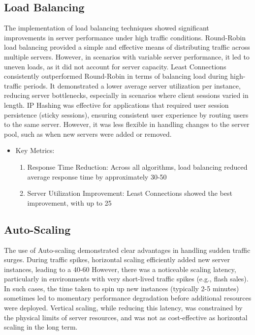 \documentclass{article}
\begin{document}
\subsection{Load Balancing}
The implementation of load balancing techniques showed significant improvements in server performance under high traffic conditions. Round-Robin load balancing provided a simple and effective means of distributing traffic across multiple servers. However, in scenarios with variable server performance, it led to uneven loads, as it did not account for server capacity.
Least Connections consistently outperformed Round-Robin in terms of balancing load during high-traffic periods. It demonstrated a lower average server utilization per instance, reducing server bottlenecks, especially in scenarios where client sessions varied in length.
IP Hashing was effective for applications that required user session persistence (sticky sessions), ensuring consistent user experience by routing users to the same server. However, it was less flexible in handling changes to the server pool, such as when new servers were added or removed.
\begin{itemize}
    \item Key Metrics:
    \begin{enumerate}
        \item Response Time Reduction: Across all algorithms, load balancing reduced average response time by approximately 30-50%
        \item Server Utilization Improvement: Least Connections showed the best improvement, with up to 25%
    \end{enumerate}
\end{itemize}

\subsection{Auto-Scaling}

The use of Auto-scaling demonstrated clear advantages in handling sudden traffic surges. During traffic spikes, horizontal scaling efficiently added new server instances, leading to a 40-60%
However, there was a noticeable scaling latency, particularly in environments with very short-lived traffic spikes (e.g., flash sales). In such cases, the time taken to spin up new instances (typically 2-5 minutes) sometimes led to momentary performance degradation before additional resources were deployed.
Vertical scaling, while reducing this latency, was constrained by the physical limits of server resources, and was not as cost-effective as horizontal scaling in the long term.
\end{document}
